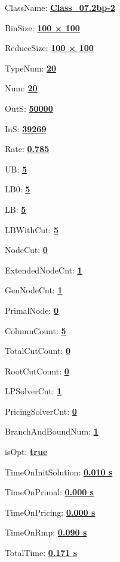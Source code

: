 \documentclass[11pt]{article}
\begin{document}
\pagestyle{empty}


ClassName: \underline{\textbf{Class_07.2bp-2}}
\par
BinSize: \underline{\textbf{100 × 100}}
\par
ReduceSize: \underline{\textbf{100 × 100}}
\par
TypeNum: \underline{\textbf{20}}
\par
Num: \underline{\textbf{20}}
\par
OutS: \underline{\textbf{50000}}
\par
InS: \underline{\textbf{39269}}
\par
Rate: \underline{\textbf{0.785}}
\par
UB: \underline{\textbf{5}}
\par
LB0: \underline{\textbf{5}}
\par
LB: \underline{\textbf{5}}
\par
LBWithCut: \underline{\textbf{5}}
\par
NodeCut: \underline{\textbf{0}}
\par
ExtendedNodeCnt: \underline{\textbf{1}}
\par
GenNodeCnt: \underline{\textbf{1}}
\par
PrimalNode: \underline{\textbf{0}}
\par
ColumnCount: \underline{\textbf{5}}
\par
TotalCutCount: \underline{\textbf{0}}
\par
RootCutCount: \underline{\textbf{0}}
\par
LPSolverCnt: \underline{\textbf{1}}
\par
PricingSolverCnt: \underline{\textbf{0}}
\par
BranchAndBoundNum: \underline{\textbf{1}}
\par
isOpt: \underline{\textbf{true}}
\par
TimeOnInitSolution: \underline{\textbf{0.010 s}}
\par
TimeOnPrimal: \underline{\textbf{0.000 s}}
\par
TimeOnPricing: \underline{\textbf{0.000 s}}
\par
TimeOnRmp: \underline{\textbf{0.090 s}}
\par
TotalTime: \underline{\textbf{0.171 s}}
\par
\newpage


\end{document}
